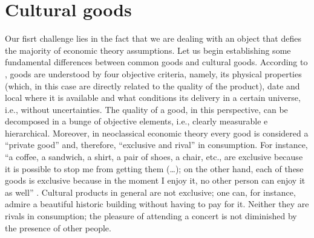 \documentclass[a4paper, 12pt, openright, oneside, german, french, brazil, english, article]{abntex2}
\begin{document}
	


	\section{Cultural goods}
	
	
	Our fisrt challenge lies in the fact that we are dealing with an object that defies the majority of economic theory assumptions. Let us begin establishing some fundamental differences between common goods and cultural goods. According to , goods are understood by four objective criteria, namely, its physical properties (which, in this case are directly related to the quality of the product), date and local where it is available and what conditions its delivery in a certain universe, i.e., without uncertainties. The quality of a good, in this perspective, can be decomposed in a bunge of objective elements, i.e., clearly measurable e hierarchical. Moreover, in neoclassical economic theory every good is considered a ``private good'' and, therefore, ``exclusive and rival'' in consumption. For instance, ``a coffee, a sandwich, a shirt, a pair of shoes, a chair, etc., are exclusive because it is possible to stop me from getting them (\ldots); on the other hand, each of these goods is exclusive because in the moment I enjoy it, no other person can enjoy it as well'' \cite[p. 29]{tolila2007cultura}. Cultural products in general are not exclusive; one can, for instance, admire a beautiful historic building without having to pay for it. Neither they are rivals in consumption; the pleasure of attending a concert is not diminished by the presence of other people. 
\end{document}
